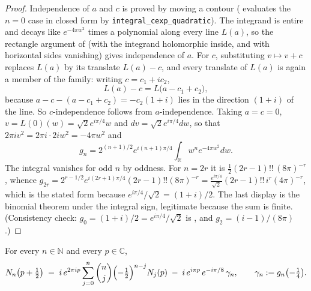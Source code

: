 \begin{proof}
Independence of $a$ and $c$ is proved by moving a contour ( evaluates the
$n=0$ case in closed form by \texttt{integral\_cexp\_quadratic}).  The integrand is entire and
decays like $e^{-4\pi w^{2}}$ times a polynomial along every line $L(a)$, so the rectangle argument
of  (with the integrand holomorphic inside, and with horizontal sides
vanishing) gives
independence of $a$.  For $c$, substituting $v\mapsto v+c$ replaces $L(a)$ by its translate
$L(a)-c$, and every translate of $L(a)$ is again a member of the family: writing $c=c_{1}+ic_{2}$,
\[
  L(a)-c=L\bigl(a-c_{1}+c_{2}\bigr),
\]
because $a-c-(a-c_{1}+c_{2})=-c_{2}(1+i)$ lies in the direction $(1+i)$ of the line.  So
$c$-independence follows from $a$-independence.  Taking $a=c=0$, $v=L(0)(w)=\sqrt2e^{i\pi/4}w$ and
$dv=\sqrt2e^{i\pi/4}dw$, so that $2\pi iv^{2}=2\pi i\cdot2iw^{2}=-4\pi w^{2}$ and
\[
  g_{n}=2^{(n+1)/2}e^{i(n+1)\pi/4}\int_{\mathbb{R}}w^{n}e^{-4\pi w^{2}}dw .
\]
The integral vanishes for odd $n$ by oddness.  For $n=2r$ it is
$\tfrac12(2r-1)!!\,(8\pi)^{-r}$, whence
$g_{2r}=2^{r-1/2}e^{i(2r+1)\pi/4}(2r-1)!!(8\pi)^{-r}
 =\tfrac{e^{i\pi/4}}{\sqrt2}(2r-1)!!\,i^{r}(4\pi)^{-r}$, which is the stated form because
$e^{i\pi/4}/\sqrt2=(1+i)/2$.  The last display is the binomial theorem under the integral sign,
legitimate because the sum is finite.  (Consistency check: $g_{0}=(1+i)/2=e^{i\pi/4}/\sqrt2$ is
, and $g_{2}=(i-1)/(8\pi)$.)
\end{proof}

\begin{lemma}
\label{lem:rsg_half_shift}
For every $n\in\mathbb{N}$ and every $p\in\mathbb{C}$,
\[
  N_{n}\bigl(p+\tfrac12\bigr)
   \;=\;i\,e^{2\pi ip}\sum_{j=0}^{n}\binom nj\Bigl(-\tfrac12\Bigr)^{n-j}N_{j}(p)
     \;-\;i\,e^{i\pi p}\,e^{-i\pi/8}\,\gamma_{n},
  \qquad \gamma_{n}:=g_{n}\bigl(-\tfrac14\bigr).
\]
\end{lemma}

